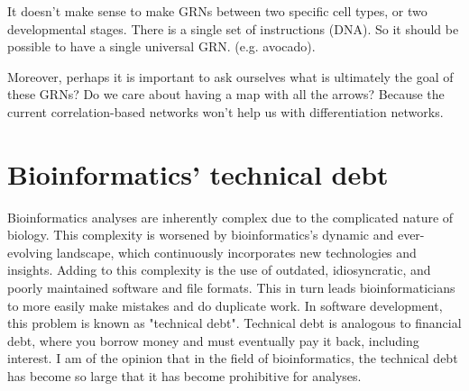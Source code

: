 It doesn't make sense to make GRNs between two specific cell types, or two developmental stages. There is a single set of instructions (DNA). So it should be possible to have a single universal GRN. (e.g. avocado).

Moreover, perhaps it is important to ask ourselves what is ultimately the goal of these GRNs? Do we care about having a map with all the arrows? Because the current correlation-based networks won't help us with differentiation networks. 

\section{Bioinformatics' technical debt}

Bioinformatics analyses are inherently complex due to the complicated nature of biology. This complexity is worsened by bioinformatics's dynamic and ever-evolving landscape, which continuously incorporates new technologies and insights. Adding to this complexity is the use of outdated, idiosyncratic, and poorly maintained software and file formats. This in turn leads bioinformaticians to more easily make mistakes and do duplicate work. In software development, this problem is known as "technical debt". Technical debt is analogous to financial debt, where you borrow money and must eventually pay it back, including interest. I am of the opinion that in the field of bioinformatics, the technical debt has become so large that it has become prohibitive for analyses.

